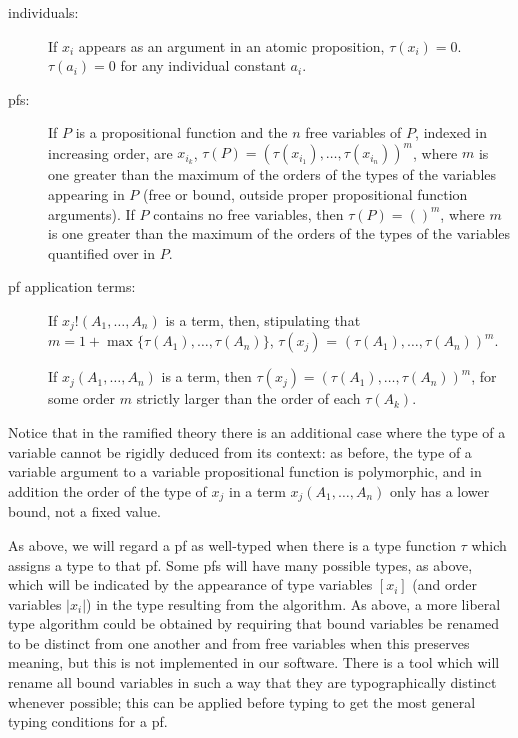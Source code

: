 \documentclass{article}
\begin{document}
\begin{description}

\item[individuals:] If $x_i$ appears as an argument in an atomic
proposition, $\tau(x_i) = 0$.  $\tau(a_i) = 0$ for any individual
constant $a_i$.

\item[pfs:] If $P$ is a propositional function and
the $n$ free variables of $P$, indexed in increasing order, are
$x_{i_k}$, $\tau(P) = (\tau(x_{i_1}),\ldots,\tau(x_{i_n}))^m$, where
$m$ is one greater than the maximum of the orders of the types of the
variables appearing in $P$ (free or bound, outside proper
propositional function arguments).  If $P$ contains no free variables,
then $\tau(P) = ()^m$, where $m$ is one greater than the maximum of
the orders of the types of the variables quantified over in $P$.

\item[pf application terms:] If $x_j!(A_1,\ldots,A_n)$ is a term, then, stipulating that
$m = 1+\max\{\tau(A_1),\ldots,\tau(A_n)\}$,
$\tau(x_j)$ = $(\tau(A_1),\ldots,\tau(A_n))^m$.  

If
$x_j(A_1,\ldots,A_n)$ is a term, then $\tau(x_j) =
(\tau(A_1),\ldots,\tau(A_n))^m$, for some order $m$ strictly
larger than the order of each $\tau(A_k)$.

\end{description}

Notice that in the ramified theory there is an additional case where
the type of a variable cannot be rigidly deduced from its context: as
before, the type of a variable argument to a variable propositional
function is polymorphic, and in addition the order of the type of
$x_j$ in a term $x_j(A_1,\ldots,A_n)$ only has a lower bound, not a
fixed value.

As above, we will regard a pf as well-typed when there is a type
function $\tau$ which assigns a type to that pf.  Some pfs will have
many possible types, as above, which will be indicated by the
appearance of type variables $[x_i]$ (and order variables $|x_i|$) in
the type resulting from the algorithm.  As above, a more liberal type
algorithm could be obtained by requiring that bound variables be
renamed to be distinct from one another and from free variables when
this preserves meaning, but this is not implemented in our software.
There is a tool which will rename all bound variables in such a way
that they are typographically distinct whenever possible; this can be
applied before typing to get the most general typing conditions for a
pf.
\end{document}
